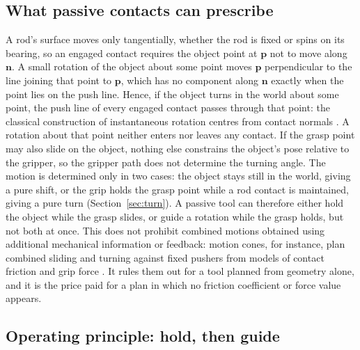 \subsection{What passive contacts can prescribe}
\label{sec:separation}

A rod's surface moves only tangentially, whether the rod is fixed or spins on its bearing, so an engaged contact requires the object point at $\mathbf p$ not to move along $\mathbf n$. A small rotation of the object about some point moves $\mathbf p$ perpendicular to the line joining that point to $\mathbf p$, which has no component along $\mathbf n$ exactly when the point lies on the push line. Hence, if the object turns in the world about some point, the push line of every engaged contact passes through that point: the classical construction of instantaneous rotation centres from contact normals \cite{mason2001mechanics}. A rotation about that point neither enters nor leaves any contact. If the grasp point may also slide on the object, nothing else constrains the object's pose relative to the gripper, so the gripper path does not determine the turning angle. The motion is determined only in two cases: the object stays still in the world, giving a pure shift, or the grip holds the grasp point while a rod contact is maintained, giving a pure turn (Section~\ref{sec:turn}). A passive tool can therefore either hold the object while the grasp slides, or guide a rotation while the grasp holds, but not both at once. This does not prohibit combined motions obtained using additional mechanical information or feedback: motion cones, for instance, plan combined sliding and turning against fixed pushers from models of contact friction and grip force \cite{chavan2020planar}. It rules them out for a tool planned from geometry alone, and it is the price paid for a plan in which no friction coefficient or force value appears.

\subsection{Operating principle: hold, then guide}

